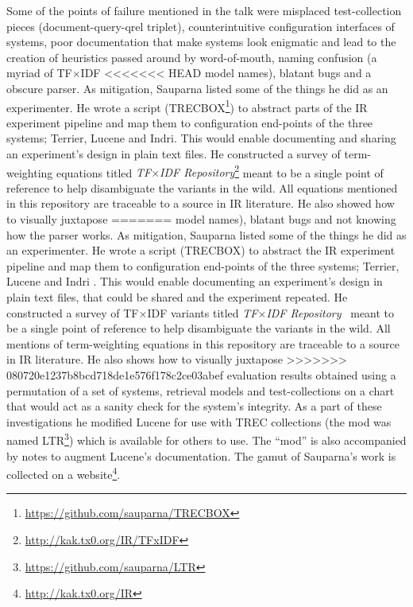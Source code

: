 Some of the points of failure mentioned in the talk were misplaced
test-collection pieces (document-query-qrel triplet), counterintuitive
configuration interfaces of systems, poor documentation that make
systems look enigmatic and lead to the creation of heuristics passed
around by word-of-mouth, naming confusion (a myriad of TF$\times$IDF
<<<<<<< HEAD
model names), blatant bugs and a obscure parser. As mitigation,
Sauparna listed some of the things he did as an experimenter. He wrote
a script (TRECBOX\footnote{\url{https://github.com/sauparna/TRECBOX}})
to abstract parts of the IR experiment pipeline and map them to
configuration end-points of the three systems; Terrier, Lucene and
Indri. This would enable documenting and sharing an experiment's
design in plain text files. He constructed a survey of term-weighting
equations titled \emph{TF$\times$IDF
  Repository}\footnote{\url{http://kak.tx0.org/IR/TFxIDF}} meant to be
a single point of reference to help disambiguate the variants in the
wild. All equations mentioned in this repository are traceable to a
source in IR literature. He also showed how to visually juxtapose
=======
model names), blatant bugs and not knowing how the parser works. As
mitigation, Sauparna listed some of the things he did as an
experimenter. He wrote a script (TRECBOX) to abstract the IR
experiment pipeline and map them to configuration end-points of the
three systems; Terrier, Lucene and Indri \cite{Strohman05indri:a}. This would enable
documenting an experiment's design in plain text files, that could be
shared and the experiment repeated. He constructed a survey of
TF$\times$IDF variants titled \emph{TF$\times$IDF
  Repository}~\cite{rup:TFXIDFRepository} meant to be a single point
of reference to help disambiguate the variants in the wild. All
mentions of term-weighting equations in this repository are traceable
to a source in IR literature. He also shows how to visually juxtapose
>>>>>>> 080720e1237b8bcd718de1e576f178c2ce03abef
evaluation results obtained using a permutation of a set of systems,
retrieval models and test-collections on a chart that would act as a
sanity check for the system's integrity. As a part of these
investigations he modified Lucene for use with TREC collections (the
mod was named LTR\footnote{\url{https://github.com/sauparna/LTR}})
which is available for others to use. The ``mod'' is also accompanied
by notes to augment Lucene's documentation. The gamut of Sauparna's
work is collected on a website\footnote{\url{http://kak.tx0.org/IR}}.

